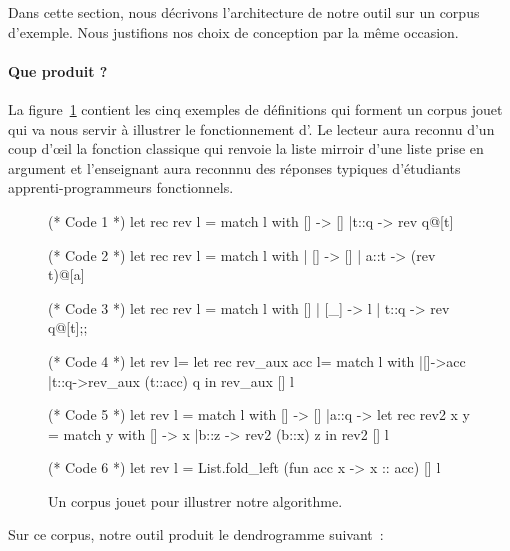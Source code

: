 Dans cette section, nous décrivons l'architecture de notre outil sur
un corpus d'exemple. Nous justifions nos choix de conception par la
même occasion.

\paragraph{Que produit {\Asak}?}
La figure~\ref{fig:example:sources} contient les cinq
exemples de définitions {\OCaml} qui forment un corpus jouet
qui va nous servir à illustrer le fonctionnement d'{\Asak}.
Le lecteur aura reconnu d'un coup d'{\oe}il la fonction classique qui
renvoie la liste mirroir d'une liste prise en argument et l'enseignant
aura reconnnu des réponses typiques d'étudiants apprenti-programmeurs
fonctionnels.

\begin{figure}

\begin{ocaml}
(* Code 1 *)
let rec rev l = match l with
    [] -> []
  |t::q -> rev q@[t]

(* Code 2 *)
let rec rev l =
  match l with
  | [] -> []
  | a::t -> (rev t)@[a]

(* Code 3 *)
let rec rev l = match l with
    [] | [_] -> l
  | t::q -> rev q@[t];;

(* Code 4 *)
let rev l=
  let rec rev_aux acc l=
    match l with
    |[]->acc
    |t::q->rev_aux (t::acc) q
  in rev_aux [] l

(* Code 5 *)
let rev l =
  match l with
    [] -> []
  |a::q -> let rec rev2 x y = match y with
        [] -> x
      |b::z -> rev2 (b::x) z in rev2 [] l

(* Code 6 *)
let rev l =
  List.fold_left (fun acc x -> x :: acc) [] l
\end{ocaml}

\label{fig:example:sources}
\caption{Un corpus jouet pour illustrer notre algorithme.}
\end{figure}

Sur ce corpus, notre outil produit le dendrogramme suivant~:

\begin{center}
\end{center}

